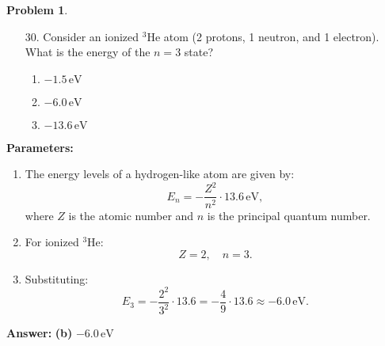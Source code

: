 \documentclass[12pt]{article}
\theoremstyle{definition} %
\newtheorem{problem}{Problem}
\theoremstyle{plain} %
\begin{document}
\begin{problem}
    \begin{enumerate}
        \item[30.] Consider an ionized \( ^3\text{He} \) atom (2 protons, 1 neutron, and 1 electron). What is the energy of the \(n = 3\) state?
        \begin{enumerate}
            \item \(-1.5 \, \text{eV}\)
            \item \textbf{\(-6.0 \, \text{eV}\)}
            \item \(-13.6 \, \text{eV}\)
        \end{enumerate}
    \end{enumerate}
    
    \textbf{Parameters:}
    \begin{enumerate}
        \item The energy levels of a hydrogen-like atom are given by:
        $$
        E_n = - \frac{Z^2}{n^2} \cdot 13.6 \, \text{eV},
        $$
        where \(Z\) is the atomic number and \(n\) is the principal quantum number.
        \item For ionized \( ^3\text{He} \):
        $$
        Z = 2, \quad n = 3.
        $$
        \item Substituting:
        $$
        E_3 = - \frac{2^2}{3^2} \cdot 13.6 = - \frac{4}{9} \cdot 13.6 \approx -6.0 \, \text{eV}.
        $$
    \end{enumerate}
    
    \textbf{Answer:} \textbf{(b)} \(-6.0 \, \text{eV}\)
    
\end{problem}
\end{document}

